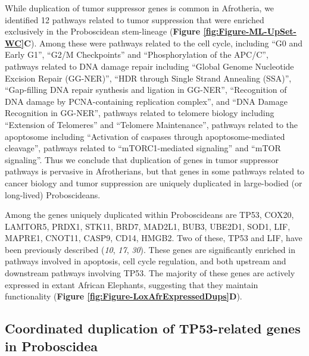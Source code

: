 \documentclass[]{elsarticle} %
\begin{document}
While duplication of tumor suppressor genes is common in Afrotheria, we identified 12 pathways related to tumor suppression that were enriched exclusively in the Proboscidean stem-lineage (\textbf{Figure \ref{fig:Figure-ML-UpSet-WC}C}). Among these were pathways related to the cell cycle, including ``G0 and Early G1'', ``G2/M Checkpoints'' and ``Phosphorylation of the APC/C'', pathways related to DNA damage repair including ``Global Genome Nucleotide Excision Repair (GG-NER)'', ``HDR through Single Strand Annealing (SSA)'', ``Gap-filling DNA repair synthesis and ligation in GG-NER'', ``Recognition of DNA damage by PCNA-containing replication complex'', and ``DNA Damage Recognition in GG-NER'', pathways related to telomere biology including ``Extension of Telomeres'' and ``Telomere Maintenance'', pathways related to the apoptosome including ``Activation of caspases through apoptosome-mediated cleavage'', pathways related to ``mTORC1-mediated signaling'' and ``mTOR signaling''. Thus we conclude that duplication of genes in tumor suppressor pathways is pervasive in Afrotherians, but that genes in some pathways related to cancer biology and tumor suppression are uniquely duplicated in large-bodied (or long-lived) Proboscideans.

Among the genes uniquely duplicated within Proboscideans are TP53, COX20, LAMTOR5, PRDX1, STK11, BRD7, MAD2L1, BUB3, UBE2D1, SOD1, LIF, MAPRE1, CNOT11, CASP9, CD14, HMGB2. Two of these, TP53 and LIF, have been previously described (\emph{10}, \emph{17}, \emph{30}). These genes are significantly enriched in pathways involved in apoptosis, cell cycle regulation, and both upstream and downstream pathways involving TP53. The majority of these genes are actively expressed in extant African Elephants, suggesting that they maintain functionality (\textbf{Figure \ref{fig:Figure-LoxAfrExpressedDups}D}).

\hypertarget{coordinated-duplication-of-tp53-related-genes-in-proboscidea}{%
\subsection{Coordinated duplication of TP53-related genes in Proboscidea}\label{coordinated-duplication-of-tp53-related-genes-in-proboscidea}}
\end{document}
